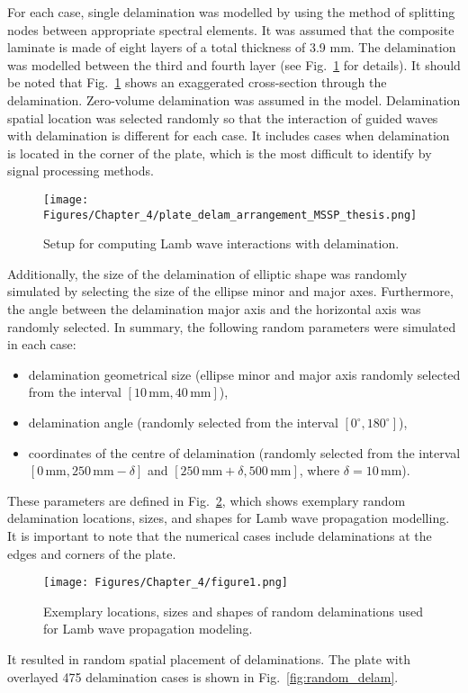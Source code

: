 For each case, single delamination was modelled by using the method of splitting nodes between appropriate spectral elements. 
It was assumed that the composite laminate is made of eight layers of a total thickness of 3.9 mm.
The delamination was modelled between the third and fourth layer (see Fig.~\ref{fig:plate_setup} for details).
It should be noted that Fig.~\ref{fig:plate_setup} shows an exaggerated cross-section through the delamination. 
Zero-volume delamination was assumed in the model. 
Delamination spatial location was selected randomly so that the interaction of guided waves with delamination is different for each case.
It includes cases when delamination is located in the corner of the plate, which is the most difficult to identify by signal processing methods.
\begin{figure}
	\centering
	\texttt{[image: Figures/Chapter\_4/plate\_delam\_arrangement\_MSSP\_thesis.png]}
	\caption{Setup for computing Lamb wave interactions with delamination.}
	\label{fig:plate_setup}
\end{figure}
Additionally, the size of the delamination of elliptic shape was randomly simulated by selecting the size of the ellipse minor and major axes.
Furthermore, the angle between the delamination major axis and the horizontal axis was randomly selected.
In summary, the following random parameters were simulated in each case:
\begin{itemize}
	\item delamination geometrical size	(ellipse minor and major axis randomly selected from the interval \(\left[10 \, \textrm{mm}, 40\, \textrm{mm}\right]\)),
	\item delamination angle (randomly selected from the interval \( \left[ 0^{\circ}, 180^{\circ} \right]\)),
	\item coordinates of the centre of delamination (randomly selected from the interval \(\left[0\, \textrm{mm}, 250\, \textrm{mm} -\delta \right]\) and \( \left[250\, \textrm{mm}+\delta, 500\, \textrm{mm} \right] \), where \(\delta = 10\, \textrm{mm}\)).
\end{itemize}
These parameters are defined in Fig.~\ref{fig:random_delaminations}, which shows exemplary random delamination locations, sizes, and shapes for Lamb wave propagation modelling.
It is important to note that the numerical cases include delaminations at the edges and corners of the plate.
\begin{figure}[!htb]
	\centering
	\texttt{[image: Figures/Chapter\_4/figure1.png]}
	\caption{Exemplary locations, sizes and shapes of random delaminations used for Lamb wave propagation modeling.}
	\label{fig:random_delaminations}
\end{figure}
It resulted in random spatial placement of delaminations. The plate with overlayed 475 delamination cases is shown in Fig.~\ref{fig:random_delam}.

